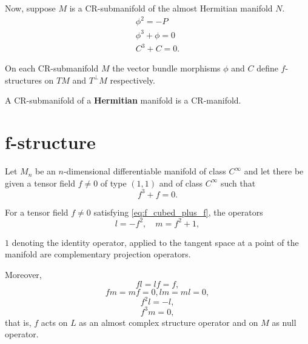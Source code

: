 \begin{remark}
     Now, suppose \( M \) is a CR-submanifold of the almost Hermitian manifold \( N \). 
    \begin{equation}
        \begin{aligned}
            \phi^2 = -P\\
            \phi^3 + \phi = 0\\
            C^3 + C = 0.
        \end{aligned}
    \end{equation}
\end{remark}


\begin{proposition}
    On each CR-submanifold \( M \) the vector bundle 
morphisms \( \phi \) and \( C \) define \( f \)-structures on \( TM \) and \( T^{\perp}M \) 
respectively.
\end{proposition}

\begin{theorem}
    A CR-submanifold of a \textbf{Hermitian} manifold is a CR-manifold.
\end{theorem}

\section{f-structure}

Let \( M_n \) be an \( n \)-dimensional differentiable manifold of class \( C^{\infty} \) and 
let there be given a tensor field \( f \neq 0 \) of type \( (1,1) \) and of class \( C^{\infty} \) such that
\begin{equation}
f^3 + f = 0.
\label{eq:f_cubed_plus_f}
\end{equation}

\begin{theorem}
    For a tensor field \( f \neq 0 \) satisfying \eqref{eq:f_cubed_plus_f}, the operators
\begin{equation}
l = -f^2, \quad m = f^2 + 1,
\label{eq:operators_l_m}
\end{equation}

\( 1 \) denoting the identity operator, applied to the tangent space at a point of the manifold are complementary projection operators.

Moreover,
\begin{equation}
fl = lf = f,
\label{eq:fl_lf_f}
\end{equation}
\begin{equation}
fm = mf = 0, lm=ml=0,
\label{eq:fm_mf}
\end{equation}
\begin{equation}
f^2 l = -l,
\label{eq:f2l}
\end{equation}
\begin{equation}
f^3 m = 0,
\label{eq:f3m}
\end{equation}
that is, \( f \) acts on \( L \) as an almost complex structure operator and on \( M \) as null operator.
\end{theorem}

